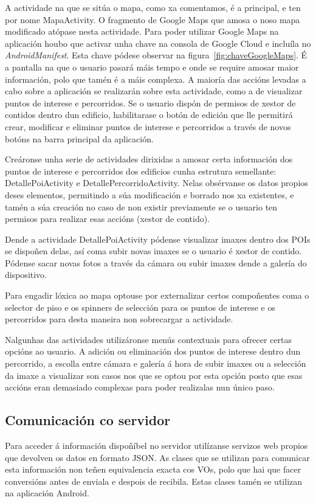 A actividade na que se sitúa o mapa, como xa comentamos, é a principal, e ten por nome MapaActivity. O fragmento de Google Maps que amosa o noso mapa modificado atópase nesta actividade. Para poder utilizar Google Maps na aplicación houbo que activar unha chave na consola de Google Cloud e incluíla no \emph{AndroidManifest}. Esta chave pódese observar na figura~\ref{fig:chaveGoogleMaps}. É a pantalla na que o usuario pasará máis tempo e onde se require amosar maior información, polo que tamén é a máis complexa. A maioría das accións levadas a cabo sobre a aplicación se realizarán sobre esta actividade, como a de visualizar puntos de interese e percorridos. Se o usuario dispón de permisos de xestor de contidos dentro dun edificio, habilitarase o botón de edición que lle permitirá crear, modificar e eliminar puntos de interese e percorridos a través de novos botóns na barra principal da aplicación.

Creáronse unha serie de actividades dirixidas a amosar certa información dos puntos de interese e percorridos dos edificios cunha estrutura semellante: DetallePoiActivity e DetallePercorridoActivity. Nelas obsérvanse os datos propios deses elementos, permitindo a súa modificación e borrado nos xa existentes, e tamén a súa creación no caso de non existir previamente se o usuario ten permisos para realizar esas accións (xestor de contido).

Dende a actividade DetallePoiActivity pódense visualizar imaxes dentro dos POIs se dispoñen delas, así coma subir novas imaxes se o usuario é xestor de contido. Pódense sacar novas fotos a través da cámara ou subir imaxes dende a galería do dispositivo.

Para engadir lóxica ao mapa optouse por externalizar certos compoñentes coma o selector de piso e os spinners de selección para os puntos de interese e os percorridos para desta maneira non sobrecargar a actividade.

Nalgunhas das actividades utilizáronse menús contextuais para ofrecer certas opcións ao usuario. A adición ou eliminación dos puntos de interese dentro dun percorrido, a escolla entre cámara e galería á hora de subir imaxes ou a selección da imaxe a visualizar son casos nos que se optou por esta opción posto que esas accións eran demasiado complexas para poder realizalas nun único paso.


\subsection{Comunicación co servidor}
Para acceder á información dispoñíbel no servidor utilízanse servizos web propios que devolven os datos en formato JSON. As clases que se utilizan para comunicar esta información non teñen equivalencia exacta cos VOs, polo que hai que facer conversións antes de enviala e despois de recibila. Estas clases tamén se utilizan na aplicación Android.

